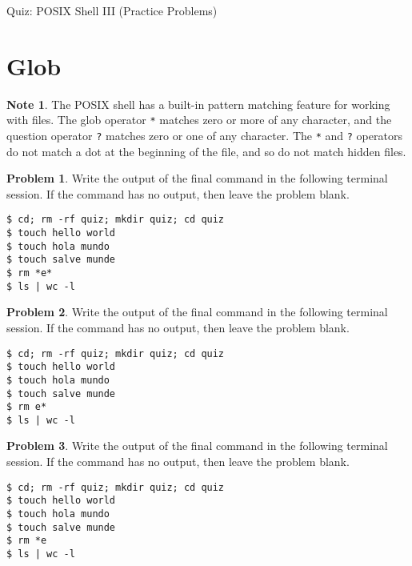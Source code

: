 \documentclass[10pt]{article}
\theoremstyle{definition}
\newtheorem{problem}{Problem}
\newtheorem{note}{Note}
\begin{document}
\begin{center}
    {
\Large
    Quiz: POSIX Shell III (Practice Problems)
}

    \vspace{0.1in}
\end{center}

\section{Glob}

\begin{note}
    The POSIX shell has a built-in pattern matching feature for working with files.
    The glob operator \lstinline{*} matches zero or more of any character,
    and the question operator \lstinline{?} matches zero or one of any character.
    The \lstinline{*} and \lstinline{?} operators do not match a dot at the beginning of the file, and so do not match hidden files.
\end{note}

\filbreak
\begin{problem}
    Write the output of the final command in the following terminal session.
    If the command has no output, then leave the problem blank.
\end{problem}
\begin{lstlisting}
$ cd; rm -rf quiz; mkdir quiz; cd quiz
$ touch hello world
$ touch hola mundo 
$ touch salve munde
$ rm *e*
$ ls | wc -l
\end{lstlisting}

\filbreak
\begin{problem}
    Write the output of the final command in the following terminal session.
    If the command has no output, then leave the problem blank.
\end{problem}
\begin{lstlisting}
$ cd; rm -rf quiz; mkdir quiz; cd quiz
$ touch hello world
$ touch hola mundo 
$ touch salve munde
$ rm e*
$ ls | wc -l
\end{lstlisting}

\filbreak
\begin{problem}
    Write the output of the final command in the following terminal session.
    If the command has no output, then leave the problem blank.
\end{problem}
\begin{lstlisting}
$ cd; rm -rf quiz; mkdir quiz; cd quiz
$ touch hello world
$ touch hola mundo 
$ touch salve munde
$ rm *e
$ ls | wc -l
\end{lstlisting}
\end{document}
